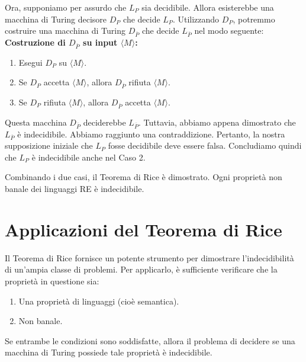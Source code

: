 \documentclass[a4paper, 11pt]{book} %
\theoremstyle{definition}
\begin{document}
Ora, supponiamo per assurdo che $L_P$ sia decidibile. Allora esisterebbe una macchina di Turing decisore $D_P$ che decide $L_P$.
Utilizzando $D_P$, potremmo costruire una macchina di Turing $D_{\overline{P}}$ che decide $L_{\overline{P}}$ nel modo seguente:
\textbf{Costruzione di $D_{\overline{P}}$ su input $\langle M \rangle$:}
\begin{enumerate}
    \item Esegui $D_P$ su $\langle M \rangle$.
    \item Se $D_P$ accetta $\langle M \rangle$, allora $D_{\overline{P}}$ rifiuta $\langle M \rangle$.
    \item Se $D_P$ rifiuta $\langle M \rangle$, allora $D_{\overline{P}}$ accetta $\langle M \rangle$.
\end{enumerate}
Questa macchina $D_{\overline{P}}$ deciderebbe $L_{\overline{P}}$. Tuttavia, abbiamo appena dimostrato che $L_{\overline{P}}$ è indecidibile. Abbiamo raggiunto una contraddizione.
Pertanto, la nostra supposizione iniziale che $L_P$ fosse decidibile deve essere falsa. Concludiamo quindi che $L_P$ è indecidibile anche nel Caso 2.

Combinando i due casi, il Teorema di Rice è dimostrato. Ogni proprietà non banale dei linguaggi RE è indecidibile.

\section{Applicazioni del Teorema di Rice}
Il Teorema di Rice fornisce un potente strumento per dimostrare l'indecidibilità di un'ampia classe di problemi. Per applicarlo, è sufficiente verificare che la proprietà in questione sia:
\begin{enumerate}
    \item Una proprietà di linguaggi (cioè semantica).
    \item Non banale.
\end{enumerate}
Se entrambe le condizioni sono soddisfatte, allora il problema di decidere se una macchina di Turing possiede tale proprietà è indecidibile.
\end{document}
